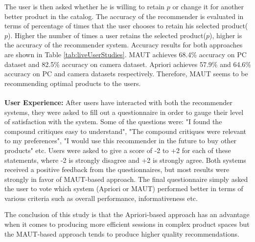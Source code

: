 The user is then asked whether he is willing to retain $p$  or change it for another better product in the catalog.
The accuracy of the recommender is evaluated in terms of percentage of times that the user chooses to retain his selected product($p$).
Higher the number of times a user retains the selected product($p$), higher is the accuracy of the recommender system.
Accuracy results for both approaches are shown in Table \ref{tab:liveUserStudies}.
MAUT achieves 68.4\% accuracy on PC dataset and 82.5\% accuracy on camera dataset.
Apriori achieves 57.9\% and 64.6\% accuracy on PC and camera datasets respectively.
Therefore, MAUT seems to be recommending optimal products to the users. \\
\\
\textbf{User Experience:}
After users have interacted with both the recommender systems, they were asked to fill out a questionnaire in order to gauge their level of satisfaction with the system.
Some of the questions were: "I found the compound critiques easy to understand", "The compound critiques were relevant to my preferences", "I would use this recommender in the future to buy other products" etc.
Users were asked to give a score of -2 to +2 for each of these statements, where -2 is strongly disagree and +2 is strongly agree.
Both systems received a positive feedback from the questionnaires, but most results were strongly in favor of MAUT-based approach.
The final questionnaire simply asked the user to vote which system (Apriori or MAUT) performed better in terms of various criteria such as overall performance, informativeness etc. 

The conclusion of this study is that the Apriori-based approach has an advantage when it comes to producing more efficient sessions in complex product spaces but the MAUT-based approach tends to produce higher quality recommendations. 

